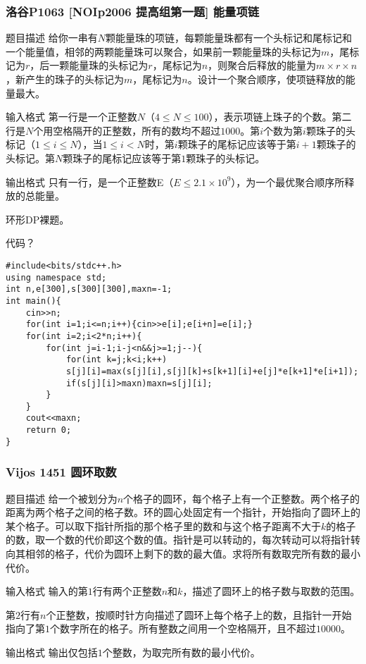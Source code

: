 \documentclass[UTF-8,aspectratio=1610]{ctexbeamer}
\begin{document}
\begin{frame}
\frametitle{洛谷P1063 [NOIp2006 提高组第一题] 能量项链}
\begin{block}{题目描述}
给你一串有$N$颗能量珠的项链，每颗能量珠都有一个头标记和尾标记和一个能量值，相邻的两颗能量珠可以聚合，如果前一颗能量珠的头标记为$m$，尾标记为$r$，后一颗能量珠的头标记为$r$，尾标记为$n$，则聚合后释放的能量为$m\times r\times n$，新产生的珠子的头标记为$m$，尾标记为$n$。设计一个聚合顺序，使项链释放的能量最大。
\end{block}
\begin{alertblock}{输入格式}
第一行是一个正整数$N$（$4\leqslant N\leqslant 100$），表示项链上珠子的个数。第二行是$N$个用空格隔开的正整数，所有的数均不超过$1000$。第$i$个数为第$i$颗珠子的头标记（$1\leqslant i\leqslant N$），当$1\leqslant i<N$时，第$i$颗珠子的尾标记应该等于第$i+1$颗珠子的头标记。第$N$颗珠子的尾标记应该等于第$1$颗珠子的头标记。
\end{alertblock}
\begin{exampleblock}{输出格式}
只有一行，是一个正整数E（$E\leqslant 2.1\times 10^9$），为一个最优聚合顺序所释放的总能量。
\end{exampleblock}
\end{frame}
\begin{frame}[fragile]
环形DP裸题。\pause

代码？\pause
\begin{verbatim}
#include<bits/stdc++.h>
using namespace std;
int n,e[300],s[300][300],maxn=-1;
int main(){
    cin>>n;
    for(int i=1;i<=n;i++){cin>>e[i];e[i+n]=e[i];}
    for(int i=2;i<2*n;i++){
        for(int j=i-1;i-j<n&&j>=1;j--){
            for(int k=j;k<i;k++)
            s[j][i]=max(s[j][i],s[j][k]+s[k+1][i]+e[j]*e[k+1]*e[i+1]);  
            if(s[j][i]>maxn)maxn=s[j][i];
        }
    } 
    cout<<maxn;
    return 0;
}
\end{verbatim}
\end{frame}
\begin{frame}
\frametitle{Vijos 1451 圆环取数}
\begin{block}{题目描述}
给一个被划分为$n$个格子的圆环，每个格子上有一个正整数。两个格子的距离为两个格子之间的格子数。环的圆心处固定有一个指针，开始指向了圆环上的某个格子。可以取下指针所指的那个格子里的数和与这个格子距离不大于$k$的格子的数，取一个数的代价即这个数的值。指针是可以转动的，每次转动可以将指针转向其相邻的格子，代价为圆环上剩下的数的最大值。求将所有数取完所有数的最小代价。
\end{block}
\begin{alertblock}{输入格式}
输入的第$1$行有两个正整数$n$和$k$，描述了圆环上的格子数与取数的范围。

第$2$行有$n$个正整数，按顺时针方向描述了圆环上每个格子上的数，且指针一开始指向了第$1$个数字所在的格子。所有整数之间用一个空格隔开，且不超过$10000$。
\end{alertblock}
\begin{exampleblock}{输出格式}
输出仅包括$1$个整数，为取完所有数的最小代价。
\end{exampleblock}
\end{frame}
\end{document}
